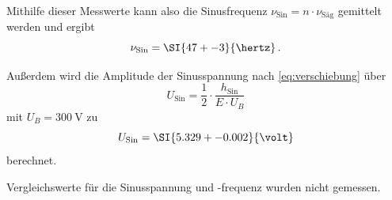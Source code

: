 Mithilfe dieser Messwerte kann also die Sinusfrequenz $\nu_\text{Sin} = n \cdot \nu_\text{Säg}$ gemittelt werden und ergibt
\begin{equation*}
    \nu_\text{Sin} = \SI{47+-3}{\hertz} \, .
\end{equation*}

Außerdem wird die Amplitude der Sinusspannung nach \autoref{eq:verschiebung} über
\begin{equation}
    U_\text{Sin} = \frac{1}{2} \cdot \frac{h_\text{Sin}}{E \cdot U_B}
\end{equation} 
mit $U_B = \SI{300}{\volt}$ zu 
\begin{equation*}
    U_\text{Sin} = \SI{5.329+-0.002}{\volt}
\end{equation*}
berechnet.

Vergleichswerte für die Sinusspannung und -frequenz wurden nicht gemessen.